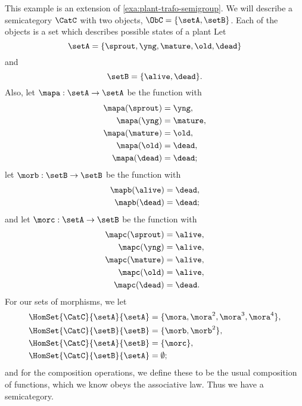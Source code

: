 \begin{example}
    \label{exa:semicat-plant-states}
    This example is an extension of \cref{exa:plant-trafo-semigroup}.
    We will describe a semicategory $\CatC$ with two objects, $\ObC = \{ \setA, \setB \}$.
    Each of the objects is a set which describes possible states of a plant
    Let
    \begin{equation}
        \setA = \{ \sprout, \yng, \mature, \old, \dead \}
    \end{equation}
    and
    \begin{equation}
        \setB = \{ \alive, \dead \}.
    \end{equation}
    Also, let $\mapa : \setA \to \setA$ be the function with
    \begin{align*}
        \mapa(\sprout) & =  \yng, \\
        \mapa(\yng)    & =  \mature, \\
        \mapa(\mature) & =  \old, \\
        \mapa( \old)   & = \dead, \\
        \mapa(\dead)   & = \dead;
    \end{align*}
    let $\morb : \setB \to \setB$ be the function with
    \begin{align*}
        \mapb(\alive) & =  \dead, \\
        \mapb(\dead)  & =  \dead;
    \end{align*}
    and let $\morc : \setA \to \setB$ be the function with
    \begin{align*}
        \mapc(\sprout) & = \alive, \\
        \mapc(\yng)    & =  \alive, \\
        \mapc(\mature) & = \alive , \\
        \mapc( \old)   & = \alive, \\
        \mapc (\dead)  & = \dead.
    \end{align*}
    For our sets of morphisms, we let
    \begin{align*}
        \HomSet{\CatC}{\setA}{\setA} & = \{ \mora, \mora^2, \mora^3, \mora^4 \}, \\
        \HomSet{\CatC}{\setB}{\setB} & =  \{ \morb, \morb^2 \}, \\
        \HomSet{\CatC}{\setA}{\setB} & =  \{ \morc \}, \\
        \HomSet{\CatC}{\setB}{\setA} & = \emptyset;
    \end{align*}
    and for the composition operations, we define these to be the usual composition of functions, which we know obeys the associative law.
    Thus we have a semicategory.
\end{example}

